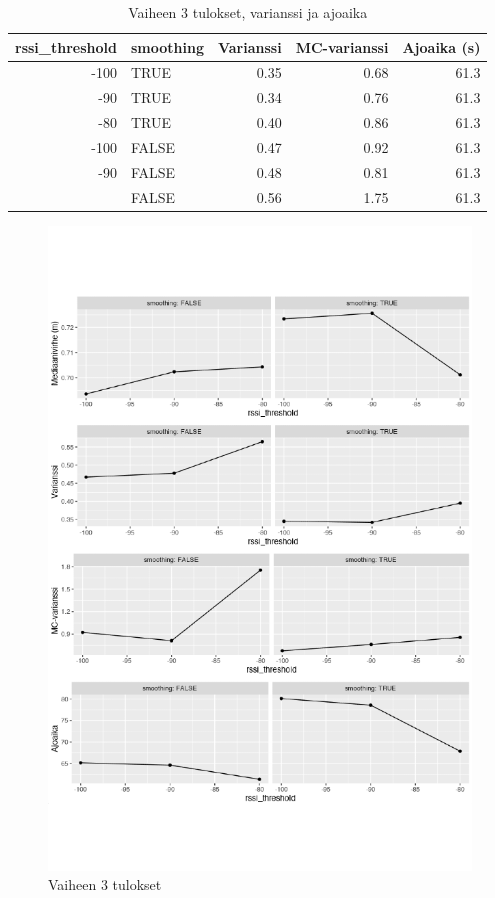 \documentclass[
  12pt,
  a4paper, twoside]{book}
\begin{document}
\begin{table}

\caption{\label{tab:vaihe-3-tulokset-varianssi}Vaiheen 3 tulokset, varianssi ja ajoaika}
\centering
\begin{tabular}[t]{rlrrr}
\toprule
rssi\_threshold & smoothing & Varianssi & MC-varianssi & Ajoaika (s)\\
\midrule
-100 & TRUE & 0.35 & 0.68 & 61.3\\
-90 & TRUE & 0.34 & 0.76 & 61.3\\
-80 & TRUE & 0.40 & 0.86 & 61.3\\
-100 & FALSE & 0.47 & 0.92 & 61.3\\
-90 & FALSE & 0.48 & 0.81 & 61.3\\
\addlinespace
-80 & FALSE & 0.56 & 1.75 & 61.3\\
\bottomrule
\end{tabular}
\end{table}

\clearpage

\begin{figure}[H]
\centering
\includegraphics[width=15cm]{phase3_results_vertical_safe}
\caption{Vaiheen 3 tulokset}
\label{fig:phase3_results}
\end{figure}
\end{document}
